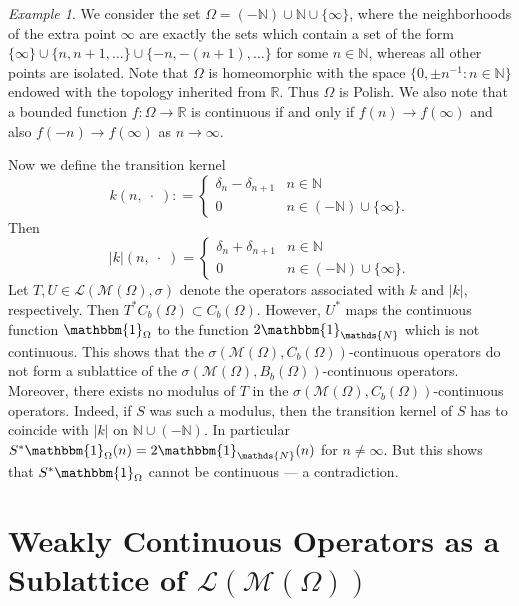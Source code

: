 \documentclass{amsart}
\numberwithin{equation}{section}
\theoremstyle{remark}
\newtheorem{example}[thm]{Example}
\theoremstyle{definition}
\begin{document}
\begin{example}
We consider the set $\Omega = (-{\mathds{N}})\cup {\mathds{N}} \cup \{\infty\}$, where the neighborhoods of the 
extra point $\infty$ are exactly the sets which contain a set of the form 
$ \{\infty\} \cup \{ n, n+1, \dots\} \cup \{-n, -(n+1),\ldots\}$
for some $n\in{\mathds{N}}$, whereas all other points are isolated. Note that $\Omega$ is homeomorphic with the space $\{0, \pm n^{-1}: n \in {\mathds{N}}\}$ endowed with 
the topology inherited from ${\mathds{R}}$. Thus $\Omega$ is Polish. We also note that a bounded function 
$f: \Omega \to {\mathds{R}}$ is continuous if and only if $f(n) \to f(\infty)$ and also $f(-n) \to f(\infty)$
as $n\to \infty$.  

Now we define the transition kernel
\[ k(n,\;\cdot\;) {\mathrel{\mathop:}=} \begin{cases} \delta_n  - \delta_{n+1}  &n\in {\mathds{N}}\\
									0 & n\in (-{\mathds{N}})\cup \{ \infty\}. \end{cases} \]
Then
\[ \lvert k\rvert(n,\;\cdot\;) = \begin{cases} \delta_n + \delta_{n+1} &n\in {\mathds{N}}\\
									0 & n \in (-{\mathds{N}})\cup \{\infty\}. \end{cases} \]									
Let $T, U\in \mathscr{L}(\mathscr{M}(\Omega),\sigma)$ denote the operators associated with $k$ and $\lvert k\rvert$, 
respectively. Then $T^*C_b(\Omega) \subset C_b(\Omega)$. However, $U^*$ maps the continuous function ${\mathbbm{1}}_\Omega$
to the function $2{\mathbbm{1}}_{\mathds{N}}$ which is not continuous. 
This shows that the $\sigma(\mathscr{M}(\Omega), C_b(\Omega))$-continuous operators do not form a sublattice 
of the $\sigma(\mathscr{M}(\Omega),B_b(\Omega))$-continuous operators. Moreover, there exists 
no modulus of $T$ in the $\sigma(\mathscr{M}(\Omega),C_b(\Omega))$-continuous operators. Indeed, if $S$ was 
such a modulus, then the transition kernel of $S$ has to
coincide with $\lvert k\rvert$ on ${\mathds{N}} \cup(-{\mathds{N}})$. In particular $S^*{\mathbbm{1}}_\Omega (n) = 2 {\mathbbm{1}}_{\mathds{N}}(n)$ for $n\neq \infty$.
But this shows that $S^*{\mathbbm{1}}_\Omega$ cannot be continuous --- a contradiction.
\end{example}

\section{Weakly Continuous Operators as a Sublattice of $\mathscr{L}(\mathscr{M}(\Omega))$}
\label{sec:sublattice}
\end{document}
